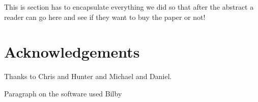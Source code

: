 \documentclass[aps,superscriptaddress,twocolumn,nopreprintnumbers,floatfix,groupedaddress]{revtex4-1}
\newcommand{\bilby}{{\sc Bilby}\xspace}
\begin{document}
This is section has to encapsulate everything we did so that after the abstract a reader can go here and see if they want to buy the paper or not!

\section{Acknowledgements}

Thanks to Chris and Hunter and Michael and Daniel.

Paragraph on the software used \bilby\cite{bilby} 

\end{document}
